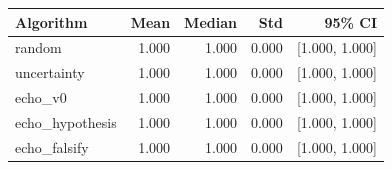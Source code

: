 \begin{tabular}{lrrrr}
\hline
Algorithm & Mean & Median & Std & 95\% CI \\
\hline
random & 1.000 & 1.000 & 0.000 & [1.000, 1.000] \\
uncertainty & 1.000 & 1.000 & 0.000 & [1.000, 1.000] \\
echo\_v0 & 1.000 & 1.000 & 0.000 & [1.000, 1.000] \\
echo\_hypothesis & 1.000 & 1.000 & 0.000 & [1.000, 1.000] \\
echo\_falsify & 1.000 & 1.000 & 0.000 & [1.000, 1.000] \\
\hline
\end{tabular}
